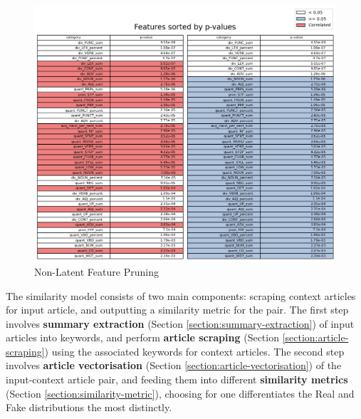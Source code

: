 \documentclass{article}
\begin{document}
\begin{figure}[H]
  \centering
  \includegraphics[width=\textwidth]{img/non_latent_feat_prune.png}
  \caption{Non-Latent Feature Pruning}
  \label{fig:non-latent-feat-prune}
\end{figure}


The similarity model consists of two main components: scraping context articles for input article, and outputting a similarity metric for the pair. The first step involves \textbf{summary extraction} (Section \ref{section:summary-extraction}) of input articles into keywords, and perform \textbf{article scraping} (Section \ref{section:article-scraping}) using the associated keywords for context articles. The second step involves \textbf{article vectorisation} (Section \ref{section:article-vectorisation}) of the input-context article pair, and feeding them into different \textbf{similarity metrics} (Section \ref{section:similarity-metric}), choosing for one differentiates the Real and Fake distributions the most distinctly.

\end{document}
